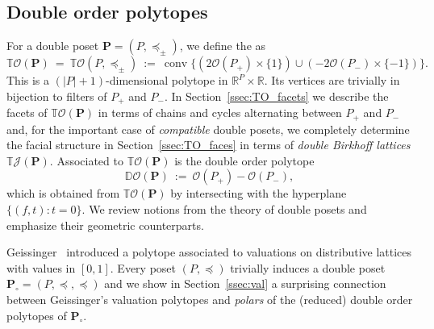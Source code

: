 \documentclass[11pt]{amsart}
\theoremstyle{definition}
\begin{document}
\subsection{Double order polytopes}
For a double poset ${\mathbf{P}} = ({P},\preceq_\pm)$, we define
the {\textbf{\color{black}{double order polytope}}} as
\[
    {{\mathbb{T}}{\mathcal{O}({\mathbf{P}})}} \ = \ {{\mathbb{T}}{\mathcal{O}({{{P},\preceq_\pm}})}} \ := \ \operatorname{conv} \bigl\{ (2{\mathcal{O}({{P}_+})}
    \times \{1\} ) \cup (-2{\mathcal{O}({{P}_-})} \times \{-1\} ) \bigr\}.
\]
This is a $(|{P}|+1)$-dimensional polytope in ${\mathbb{R}}^{P} \times {\mathbb{R}}$. Its vertices
are trivially in bijection to filters of ${P}_+$ and ${P}_-$. In
Section~\ref{ssec:TO_facets} we describe the facets of ${{\mathbb{T}}{\mathcal{O}({\mathbf{P}})}}$ in terms
of chains and cycles alternating between ${P}_+$ and ${P}_-$ and, for the
important case of \emph{compatible} double posets, we completely determine the
facial structure in Section~\ref{ssec:TO_faces} in terms of \emph{double Birkhoff
lattices} ${{\mathbb{T}}{{\mathcal{J}}({{\mathbf{P}}})}}$. Associated to ${{\mathbb{T}}{\mathcal{O}({\mathbf{P}})}}$ is the {\textbf{\color{black}{reduced}}}
double order polytope
\[
    {\mathbb{D}{\mathcal{O}({\mathbf{P}})}} \ := \ {\mathcal{O}({{P}_+})} - {\mathcal{O}({{P}_-})},
\]
which is obtained from ${{\mathbb{T}}{\mathcal{O}({\mathbf{P}})}}$ by intersecting with the hyperplane
$\{(f,t) : t = 0 \}$.  We review notions from the theory of double posets and
emphasize their geometric counterparts.

Geissinger~\cite{Geissinger} introduced a polytope associated to valuations on
distributive lattices with values in $[0,1]$. Every poset $({P},\preceq)$
trivially induces a double poset ${\mathbf{P}}_\circ = ({P},\preceq,\preceq)$ and we
show in Section~\ref{ssec:val} a surprising connection between
Geissinger's valuation polytopes and \emph{polars} of the (reduced) double
order polytopes of ${\mathbf{P}}_\circ$. 
\end{document}

